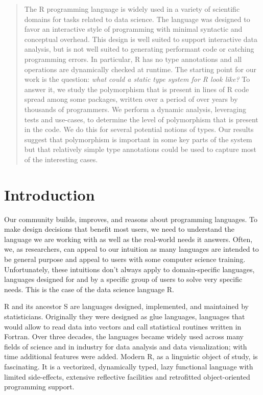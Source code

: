 \documentclass[acmsmall,10pt,review,anonymous]{acmart}\settopmatter{printfolios=true,printccs=false,printacmref=false}
\begin{document}
\begin{abstract}
The R programming language is widely used in a variety of scientific domains
for tasks related to data science. The language was designed to favor an
interactive style of programming with minimal syntactic and conceptual
overhead. This design is well suited to support interactive data analysis,
but is not well suited to generating performant code or catching programming
errors.  In particular, R has no type annotations and all operations are
dynamically checked at runtime. The starting point for our work is the
question: \emph{what could a static type system for R look like?}  To answer
it, we study the polymorphism that is present in \RLOC lines of R
code spread among some \PACKAGES packages, written over a
period of over \YEARS years by thousands of programmers.  We perform a dynamic
analysis, leveraging tests and use-cases, to determine the level of
polymorphism that is present in the code. We do this for several potential
notions of types. Our results suggest that polymorphism is important in some
key parts of the system but that relatively simple type annotations could be
used to capture most of the interesting cases.

\end{abstract}

\maketitle

\section{Introduction}

Our community builds, improves, and reasons about programming languages.  To
make design decisions that benefit most users, we need to understand the
language we are working with as well as the real-world needs it
answers. Often, we, as researchers, can appeal to our intuition as many
languages are intended to be general purpose and appeal to users with some
computer science training. Unfortunately, these intuitions don't always
apply to domain-specific languages, languages designed for and by a specific
group of users to solve very specific needs. This is the case of the data
science language R.

R and its ancestor S are languages designed, implemented, and maintained by
statisticians. Originally they were designed as glue languages, languages
that would allow to read data into vectors and call statistical routines
written in Fortran. Over three decades, the languages became widely used
across many fields of science and in industry for data analysis and data
visualization; with time additional features were added.  Modern R, as a
linguistic object of study, is fascinating. It is a vectorized, dynamically
typed, lazy functional language with limited side-effects, extensive
reflective facilities and retrofitted object-oriented programming support.
\end{document}
